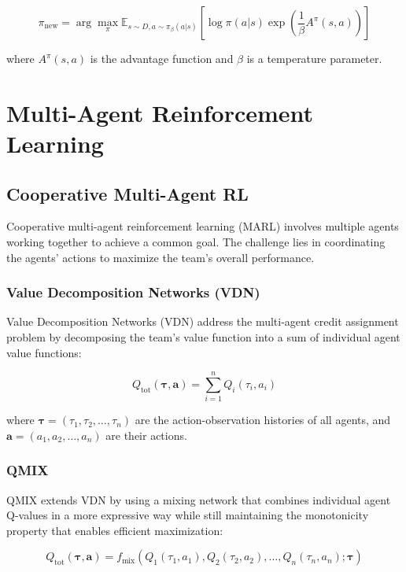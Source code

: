 \documentclass{article}
\begin{document}
\begin{equation}
\pi_{\text{new}} = \arg\max_{\pi} \mathbb{E}_{s \sim D, a \sim \pi_\beta(a|s)} \left[ \log \pi(a|s) \exp\left(\frac{1}{\beta} A^\pi(s, a)\right) \right]
\end{equation}

where $A^\pi(s, a)$ is the advantage function and $\beta$ is a temperature parameter.

\section{Multi-Agent Reinforcement Learning}

\subsection{Cooperative Multi-Agent RL}

Cooperative multi-agent reinforcement learning (MARL) involves multiple agents working together to achieve a common goal. The challenge lies in coordinating the agents' actions to maximize the team's overall performance.

\subsubsection{Value Decomposition Networks (VDN)}

Value Decomposition Networks (VDN) address the multi-agent credit assignment problem by decomposing the team's value function into a sum of individual agent value functions:

\begin{equation}
Q_{\text{tot}}(\boldsymbol{\tau}, \mathbf{a}) = \sum_{i=1}^n Q_i(\tau_i, a_i)
\end{equation}

where $\boldsymbol{\tau} = (\tau_1, \tau_2, \ldots, \tau_n)$ are the action-observation histories of all agents, and $\mathbf{a} = (a_1, a_2, \ldots, a_n)$ are their actions.

\subsubsection{QMIX}

QMIX extends VDN by using a mixing network that combines individual agent Q-values in a more expressive way while still maintaining the monotonicity property that enables efficient maximization:

\begin{equation}
Q_{\text{tot}}(\boldsymbol{\tau}, \mathbf{a}) = f_{\text{mix}}(Q_1(\tau_1, a_1), Q_2(\tau_2, a_2), \ldots, Q_n(\tau_n, a_n); \boldsymbol{\tau})
\end{equation}
\end{document}
